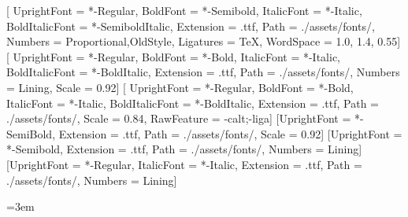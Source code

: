
\setmainfont{Source Serif 4}[
  UprightFont = *-Regular, BoldFont = *-Semibold, ItalicFont = *-Italic,
  BoldItalicFont = *-SemiboldItalic, Extension = .ttf, Path = ./assets/fonts/,
  Numbers = {Proportional,OldStyle}, Ligatures = TeX,
  WordSpace = {1.0, 1.4, 0.55}]      %
\setsansfont{Inter}[
  UprightFont = *-Regular, BoldFont = *-Bold, ItalicFont = *-Italic,
  BoldItalicFont = *-BoldItalic, Extension = .ttf, Path = ./assets/fonts/,
  Numbers = Lining, Scale = 0.92]
\setmonofont{JetBrainsMono}[
  UprightFont = *-Regular, BoldFont = *-Bold, ItalicFont = *-Italic,
  BoldItalicFont = *-BoldItalic, Extension = .ttf, Path = ./assets/fonts/,
  Scale = 0.84, RawFeature = {-calt;-liga}]
\newfontfamily{}[UprightFont = *-SemiBold, Extension = .ttf, Path = ./assets/fonts/, Scale = 0.92]
\newfontfamily{}[UprightFont = *-Semibold, Extension = .ttf, Path = ./assets/fonts/, Numbers = Lining]
\newfontfamily{}[UprightFont = *-Regular, ItalicFont = *-Italic, Extension = .ttf, Path = ./assets/fonts/, Numbers = Lining]

\linespread{1.08}
\setlength{\parindent}{0pt}
\setlength{\parskip}{0.5em plus 0.15em minus 0.05em}
\raggedbottom
\frenchspacing
{}
\emergencystretch=3em

\color{ink}

